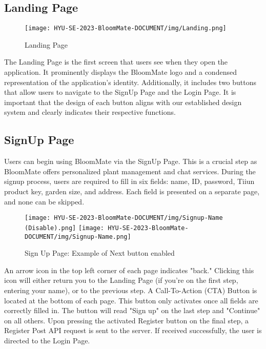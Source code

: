 \documentclass[conference, a4paper]{IEEEtran}
\begin{document}

\subsection{Landing Page}

\begin{figure}[h]
\centering
\texttt{[image: HYU-SE-2023-BloomMate-DOCUMENT/img/Landing.png]}
\label{fig:Landing}
\caption{Landing Page} 
\end{figure}

The Landing Page is the first screen that users see when they open the application. It prominently displays the BloomMate logo and a condensed representation of the application's identity. Additionally, it includes two buttons that allow users to navigate to the SignUp Page and the Login Page. It is important that the design of each button aligns with our established design system and clearly indicates their respective functions.

\subsection{SignUp Page}

Users can begin using BloomMate via the SignUp Page. This is a crucial step as BloomMate offers personalized plant management and chat services. During the signup process, users are required to fill in six fields: name, ID, password, Tiiun product key, garden size, and address. Each field is presented on a separate page, and none can be skipped.

   \begin{figure}[h]
    \centerline{
        \texttt{[image: HYU-SE-2023-BloomMate-DOCUMENT/img/Signup-Name (Disable).png]}
        \texttt{[image: HYU-SE-2023-BloomMate-DOCUMENT/img/Signup-Name.png]}
    }
    \label{fig}
    \caption{Sign Up Page: Example of Next button enabled}
    \end{figure}
    
An arrow icon in the top left corner of each page indicates "back." Clicking this icon will either return you to the Landing Page (if you're on the first step, entering your name), or to the previous step. A Call-To-Action (CTA) Button is located at the bottom of each page. This button only activates once all fields are correctly filled in. The button will read "Sign up" on the last step and "Continue" on all others. Upon pressing the activated Register button on the final step, a Register Post API request is sent to the server. If received successfully, the user is directed to the Login Page.
\end{document}
